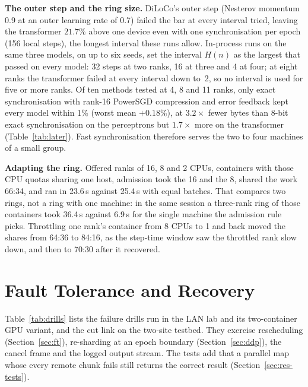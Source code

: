 \textbf{The outer step and the ring size.} DiLoCo's outer step (Nesterov momentum
0.9 at an outer learning rate of 0.7) failed the bar at every interval tried,
leaving the transformer $21.7\%$ above one device even with one synchronisation
per epoch (156 local steps), the longest interval these runs allow. In-process
runs on the same three models, on up to six seeds, set the interval $H(n)$ as
the largest that passed on every model: 32 steps at two ranks, 16 at three and
4 at four; at eight ranks the transformer failed at
every interval down to~2, so no interval is used for five or more ranks. Of ten methods tested at 4, 8 and 11 ranks, only exact synchronisation
with rank-16 PowerSGD \cite{vogels2019powersgd} compression and error feedback
kept every model within 1\% (worst mean $+0.18\%$), at $3.2\times$ fewer bytes
than 8-bit exact synchronisation on the perceptrons but $1.7\times$ more on the
transformer (Table~\ref{tab:later}). Fast synchronisation therefore serves the two to
four machines of a small group.

\textbf{Adapting the ring.} Offered ranks of 16, 8 and 2 CPUs, containers
with those CPU quotas sharing one host, admission took the 16 and the 8, shared
the work 66:34, and ran in 23.6\,s against 25.4\,s with equal batches. That compares two
rings, not a ring with one machine: in the same session a three-rank ring of
those containers took 36.4\,s against 6.9\,s for the single machine the
admission rule picks.
Throttling one rank's container from 8 CPUs to 1 and back moved the shares from
64:36 to 84:16, as the step-time window saw the throttled rank slow down, and
then to 70:30 after it recovered.

\section{Fault Tolerance and Recovery}
\label{sec:res-ft}

Table~\ref{tab:drills} lists the failure drills run in the LAN lab and its
two-container GPU variant, and the cut link on the two-site testbed. They exercise rescheduling
(Section~\ref{sec:ft}), re-sharding at an epoch boundary (Section~\ref{sec:ddp}),
the cancel frame and the logged output stream. The tests add that a parallel map whose every remote chunk fails
still returns the correct result (Section~\ref{sec:res-tests}).

